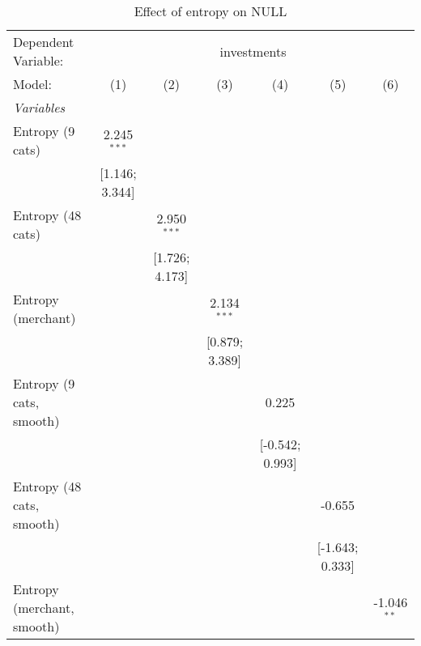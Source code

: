 
\begin{table}[htbp]
   \centering
   \tiny
   \begin{threeparttable}[b]
      \caption{\label{tab:reg_investments_nolag} Effect of entropy on NULL}
      \begin{tabular}{lcccccc}
         \tabularnewline \midrule \midrule
         Dependent Variable: & \multicolumn{6}{c}{investments}\\
         Model:                     & (1)             & (2)             & (3)             & (4)             & (5)             & (6)\\  
         \midrule
         \emph{Variables}\\
         Entropy (9 cats)           & 2.245$^{***}$   &                 &                 &                 &                 &   \\   
                                    & [1.146; 3.344]  &                 &                 &                 &                 &   \\   
         Entropy (48 cats)          &                 & 2.950$^{***}$   &                 &                 &                 &   \\   
                                    &                 & [1.726; 4.173]  &                 &                 &                 &   \\   
         Entropy (merchant)         &                 &                 & 2.134$^{***}$   &                 &                 &   \\   
                                    &                 &                 & [0.879; 3.389]  &                 &                 &   \\   
         Entropy (9 cats, smooth)   &                 &                 &                 & 0.225           &                 &   \\   
                                    &                 &                 &                 & [-0.542; 0.993] &                 &   \\   
         Entropy (48 cats, smooth)  &                 &                 &                 &                 & -0.655          &   \\   
                                    &                 &                 &                 &                 & [-1.643; 0.333] &   \\   
         Entropy (merchant, smooth) &                 &                 &                 &                 &                 & -1.046$^{**}$\\   

\end{tabular}
\end{threeparttable}
\end{table}
